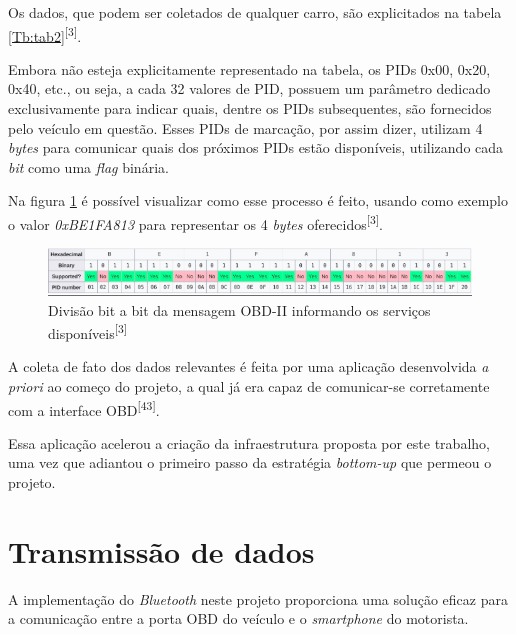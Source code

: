 Os dados, que podem ser coletados de qualquer carro, são explicitados na tabela \ref{Tb:tab2}\textsuperscript{[3]}.





Embora não esteja explicitamente representado na tabela, os PIDs 0x00, 0x20, 0x40, etc., ou seja, a cada 32 valores de PID, possuem um parâmetro dedicado exclusivamente para indicar quais, dentre os PIDs subsequentes, são fornecidos pelo veículo em questão. Esses PIDs de marcação, por assim dizer, utilizam 4 \textit{bytes} para comunicar quais dos próximos PIDs estão disponíveis, utilizando cada \textit{bit} como uma \textit{flag} binária. 

Na figura \ref{fig:bitwise_obd2} é possível visualizar como esse processo é feito, usando como exemplo o valor \textit{0xBE1FA813} para representar os 4 \textit{bytes} oferecidos\textsuperscript{[3]}.

\begin{figure}[hp]
    \centering
    
    \includegraphics[scale=0.7]{figures/tabela_dados_disponiveis.png}
    
    \caption{Divisão bit a bit da mensagem OBD-II informando os serviços disponíveis\textsuperscript{[3]}}
    
    \label{fig:bitwise_obd2}
\end{figure}


A coleta de fato dos dados relevantes é feita por uma aplicação desenvolvida \textit{a priori} ao começo do projeto, a qual já era capaz de comunicar-se corretamente com a interface OBD\textsuperscript{[43]}.

Essa aplicação acelerou a criação da infraestrutura proposta por este trabalho, uma vez que adiantou o primeiro passo da estratégia \textit{bottom-up} que permeou o projeto.



\section{Transmissão de dados}

A implementação do \textit{Bluetooth} neste projeto proporciona uma solução eficaz para a comunicação entre a porta OBD do veículo e o \textit{smartphone} do motorista. 

